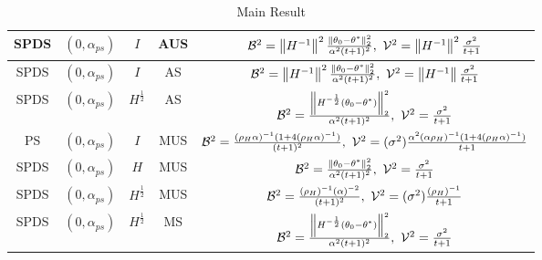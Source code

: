 \begin{table*}[t]
\begin{center}
{\begin{tabular}{|c|c|c|c|c|}
SPDS    & $(0,\alpha_{ps})$     &   $I$     & AUS        &   $\mathcal{B}^2=\left\| H^{-1}\right\|^2\frac{\left\| \theta_0-\theta^*\right\|^2_2}{\alpha^2(t+1)^2},~\mathcal{V}^2=\left\| H^{-1}\right\|^2\frac{\sigma^2}{t+1}$\\ \hline
SPDS    & $(0,\alpha_{ps})$     &   $I$     & AS        &   $\mathcal{B}^2=\left\| H^{-1}\right\|^2\frac{\left\| \theta_0-\theta^*\right\|^2_2}{\alpha^2(t+1)^2},~\mathcal{V}^2=\left\| H^{-1}\right\|\frac{\sigma^2}{t+1}$\\ \hline
SPDS    & $(0,\alpha_{ps})$     &   $H^{\frac{1}{2}}$     &AS        &   $\mathcal{B}^2=\frac{\left\| H^{-\frac{1}{2}}(\theta_0-\theta^*)\right\|^2_2}{\alpha^2(t+1)^2},~\mathcal{V}^2=\frac{\sigma^2}{t+1}$\\ \hline
PS       & $(0,\alpha_{ps})$    &   $I$     & MUS        &   $\mathcal{B}^2=\frac{(\rho_H\alpha)^{-1}(1+4(\rho_H\alpha)^{-1})}{(t+1)^2},~\mathcal{V}^2=(\sigma^2)\frac{\alpha^2(\alpha\rho_H)^{-1}(1+4(\rho_H\alpha)^{-1})}{t+1}$\\ \hline
SPDS    & $(0,\alpha_{ps})$     &   $H$     & MUS        &  $\mathcal{B}^2=\frac{\left\| \theta_0-\theta^*\right\|^2_2}{\alpha^2(t+1)^2},~\mathcal{V}^2=\frac{\sigma^2}{t+1}$\\ \hline
SPDS    & $(0,\alpha_{ps})$     &   $H^{\frac{1}{2}}$     & MUS        &   $\mathcal{B}^2=\frac{(\rho_H)^{-1}(\alpha)^{-2}}{(t+1)^2},~\mathcal{V}^2=(\sigma^2)\frac{(\rho_H)^{-1}}{t+1}$\\ \hline
SPDS    & $(0,\alpha_{ps})$     &   $H^{\frac{1}{2}}$     & MS        &   $\mathcal{B}^2=\frac{\left\| H^{-\frac{1}{2}}(\theta_0-\theta^*)\right\|^2_2}{\alpha^2(t+1)^2},~\mathcal{V}^2=\frac{\sigma^2}{t+1}$\\ \hline
\end{tabular}
}
\end{center}
\caption{Main Result}
\label{maintable}
\end{table*}
